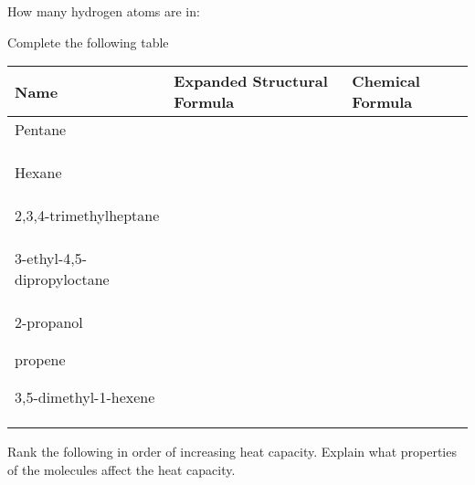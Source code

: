 \documentclass[addpoints, 12pt]{exam}
\begin{document}
\begin{questions}

\question How many hydrogen atoms are in:

\question Complete the following table

\begin{tabular}{l|l|l}
Name & Expanded Structural Formula & Chemical Formula \\
\hline
Pentane & & \\
 & & \\
 & & \\
 & & \\
\hline
Hexane & & \\
& & \\ & & \\ & & \\ \hline
2,3,4-trimethylheptane & & \\
& & \\ & & \\ & & \\ \hline
3-ethyl-4,5-dipropyloctane & & \\
& & \\ & & \\ & & \\ \hline
2-propanol
& & \\ & & \\ & & \\ \hline
propene
& & \\ & & \\ & & \\ \hline
3,5-dimethyl-1-hexene & & \\
& & \\ & & \\ & & \\ \hline
\end{tabular}


\question Rank the following in order of increasing heat capacity.
Explain what properties of the molecules affect the heat capacity.


\end{questions}
\end{document}
